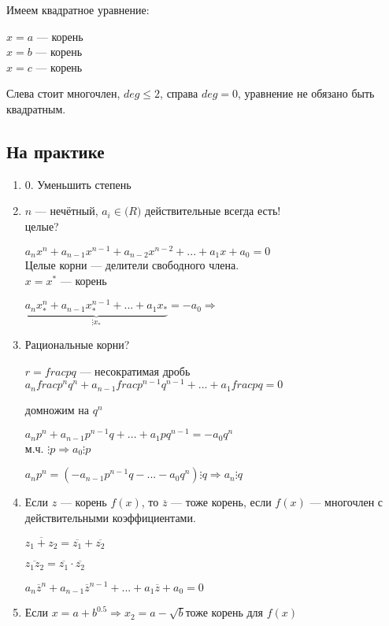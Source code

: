 \documentclass{article}
\begin{document}
    Имеем квадратное уравнение:
    
    \(x = a\) --- корень\\
    \(x = b\) --- корень\\
    \(x = c\) --- корень
    
    Слева стоит многочлен, \(deg \leq 2\), справа \(deg = 0\), уравнение не обязано быть квадратным.
    
    \subsection{На практике}
        \begin {enumerate}
            \item[\(0\).] Уменьшить степень
            \item \(n\) --- нечётный, \(a_i \in \mathbb(R)\) действительные всегда есть!\\
            целые?
            
                \( a_{n}x^{n} + a_{n-1}x^{n-1} + a_{n-2}x^{n-2} +... + a_1x + a_0 = 0\)\\
                Целые корни --- делители свободного члена.\\

            \(x = x^*\) --- корень
            
            \( \underset{\vdots x_*}{\underbrace{a_{n}x^{n}_* + a_{n-1}x^{n-1}_* + ... + a_1x_*}} = -a_0 \Rightarrow\)
        
            \item Рациональные корни?
            
            \(r = frac{p}{q}\) --- несократимая дробь\\
            \( a_{n}frac{p^{n}}{q^n} + a_{n-1}frac{p^{n-1}}{q^{n-1}} + ... + a_{1}frac{p}{q} = 0\)
            
            домножим на \(q^n\)

            \(a_{n}p^{n} + a_{n-1}p^{n-1}q + ... + a_{1}pq^{n-1} = -a_{0}q^n\)\\
            м.ч. \(\vdots p \Rightarrow a_0 \vdots p\)
            
            \(a_np^n=(-a_{n-1}p^{n-1}q -...-a_0q^n) \vdots q \Rightarrow a_n\vdots q\)

            \item Если  \(z\) --- корень \(f(x)\), то \(\overline{z}\) --- тоже корень, если \(f(x)\) --- многочлен с действительными коэффициентами.
            
            \(\overline{z_1+z_2} = \overline{z_1}+\overline{z_2}\)

            \(\overline{z_1z_2}=\overline{z_1}\cdot\overline{z_2}\)

            \(a_n\overline{z}^n + a_{n-1}\overline{z}^{n-1}+...+a_1\overline{z}+a_0=0\)
        
            \item Если \(x = a + b^{0.5} \Rightarrow x_2 = a - \sqrt{b}\)тоже корень для \(f(x)\)\\ 
        \end{enumerate}
\end{document}
